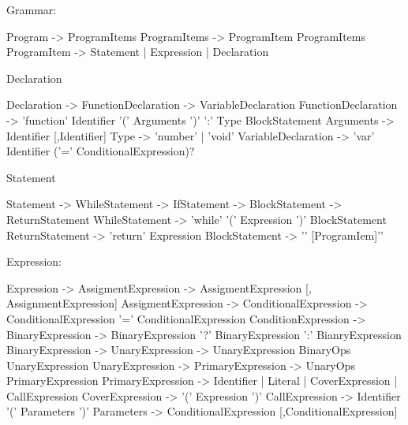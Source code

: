 \documentclass[12pt]{article}
\begin{document}
\noindent Grammar:
\begin{python}
Program      -> ProgramItems
ProgramItems -> ProgramItem ProgramItems
ProgramItem  -> Statement | Expression | Declaration
\end{python}
\noindent Declaration
\begin{python}
Declaration  -> FunctionDeclaration
             -> VariableDeclaration
FunctionDeclaration -> 'function' Identifier '(' Arguments ')' ':' Type BlockStatement
Arguments           -> Identifier [,Identifier]
Type                -> 'number' | 'void'
VariableDeclaration -> 'var' Identifier ('=' ConditionalExpression)?
\end{python}
\noindent Statement
\begin{python}
Statement -> WhileStatement
          -> IfStatement
          -> BlockStatement
          -> ReturnStatement
WhileStatement  -> 'while' '(' Expression ')' BlockStatement
ReturnStatement -> 'return' Expression
BlockStatement  -> '{' [ProgramIem]'}'
\end{python}
\noindent Expression:
\begin{python}
Expression           -> AssigmentExpression
                     -> AssigmentExpression [, AssignmentExpression] 
AssigmentExpression  -> ConditionalExpression 
                     -> ConditionalExpression '=' ConditionalExpression
ConditionExpression  -> BinaryExpression
                     -> BinaryExpression '?' BinaryExpression ':' BianryExpression
BinaryExpression     -> UnaryExpression
                     -> UnaryExpression BinaryOps UnaryExpression 
UnaryExpression      -> PrimaryExpression
                     -> UnaryOps PrimaryExpression
PrimaryExpression    -> Identifier | Literal | CoverExpression | CallExpression
CoverExpression      -> '(' Expression ')'
CallExpression       -> Identifier '(' Parameters ')'
Parameters           -> ConditionalExpression [,ConditionalExpression] 
\end{python}
\end{document}
